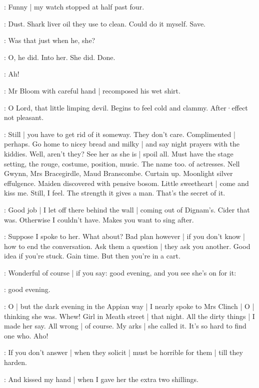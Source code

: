 \BloomToday:
Funny |
my watch stopped at half past four.

\BloomAbstract:
Dust.
Shark liver oil
they use to clean.
Could do it myself.
Save.

\BloomToday:
Was that just when he,
she?

\BloomToday:
O,
he did.
Into her.
She did.
Done.

\BloomInt:
Ah!%

:
Mr Bloom with careful hand |
recomposed his wet shirt.

\BloomCurrent:
O Lord,
that little limping devil.
Begins to feel cold and clammy.
After·effect not pleasant.

\BloomAbstract:
Still |
you have to get rid of it someway.
They don't care.
Complimented |
perhaps.
Go home to nicey bread and milky |
and say night prayers with the kiddies.
Well,
aren't they?
See her as she is |
spoil all.
Must have the stage setting,
the rouge,
costume,
position,
music.
The name too.
 of actresses.
Nell Gwynn,
Mrs Bracegirdle,
Maud Branscombe.
Curtain up.
Moonlight silver effulgence.
Maiden discovered with pensive bosom.
Little sweetheart |
come and kiss me.
Still,
I feel.
The strength it gives a man.
That's the secret of it.%

\BloomToday:
Good job |
I let off there behind the wall |
coming out of Dignam's.
Cider that was.
Otherwise I couldn't have.
Makes you want to sing after.

\BloomCurrent:
Suppose I spoke to her.
What about?
Bad plan however |
if you don't know |
how to end the conversation.
Ask them a question |
they ask you another.
Good idea
if you're stuck.
Gain time.
But then you're in a cart.

\BloomAbstract:
Wonderful of course |
if you say:
good evening,
and you see she's on for it:

\BloomOther:
good evening.

\BloomHist:
O |
but the dark evening in the Appian way |
I nearly spoke to Mrs Clinch |
O |
thinking she was.
Whew!
Girl in Meath street |
that night.
All the dirty things |
I made her say.
All wrong |
of course.
My arks |
she called it.
It's so hard to find one who.
Aho!

\BloomAbstract:
If you don't answer |
when they solicit |
must be horrible for them |%
till they harden.

\BloomHist:
And kissed my hand |
when I gave her the extra two shillings.

